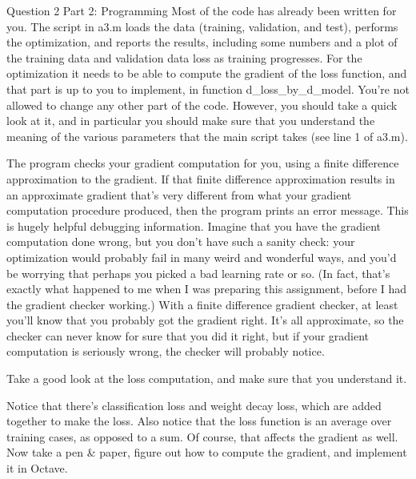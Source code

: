 Question 2
Part 2: Programming
Most of the code has already been written for you. The script in a3.m loads the data (training, validation, and test), performs the optimization, and reports the results, including some numbers and a plot of the training data and validation data loss as training progresses. For the optimization it needs to be able to compute the gradient of the loss function, and that part is up to you to implement, in function d_loss_by_d_model. You're not allowed to change any other part of the code. However, you should take a quick look at it, and in particular you should make sure that you understand the meaning of the various parameters that the main script takes (see line 1 of a3.m). 

The program checks your gradient computation for you, using a finite difference approximation to the gradient. If that finite difference approximation results in an approximate gradient that's very different from what your gradient computation procedure produced, then the program prints an error message. This is hugely helpful debugging information. Imagine that you have the gradient computation done wrong, but you don't have such a sanity check: your optimization would probably fail in many weird and wonderful ways, and you'd be worrying that perhaps you picked a bad learning rate or so. (In fact, that's exactly what happened to me when I was preparing this assignment, before I had the gradient checker working.) With a finite difference gradient checker, at least you'll know that you probably got the gradient right. It's all approximate, so the checker can never know for sure that you did it right, but if your gradient computation is seriously wrong, the checker will probably notice.

Take a good look at the loss computation, and make sure that you understand it.

Notice that there's classification loss and weight decay loss, which are added together to make the loss.
Also notice that the loss function is an average over training cases, as opposed to a sum. Of course, that affects the gradient as well.
Now take a pen & paper, figure out how to compute the gradient, and implement it in Octave. 

